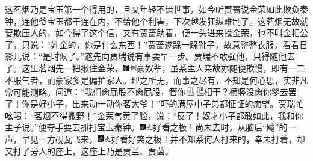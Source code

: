 这茗烟乃是宝玉第一个得用的，且又年轻不谙世事，如今听贾蔷说金荣如此欺负秦钟，连他爷宝玉都干连在内，不给他个利害，下次越发狂纵难制了。这茗烟无故就要欺压人的，如今得了这个信，又有贾蔷助着，便一头进来找金荣，也不叫金相公了，只说：``姓金的，你是什么东西！''贾蔷遂跺一跺靴子，故意整整衣服，看看日影儿说：``是时候了。''遂先向贾瑞说有事要早一步。贾瑞不敢强他，只得随他去了。这里茗烟先一把揪住金荣，{\includegraphics[width=3mm]{../Images/00006}\includegraphics[width=3mm]{../Images/00011}\footnotesize \kaishu 豪奴辈，虽系主人亲故亦随便欺慢，即有一二不服气者，而豪家多是偏护家人。理之所无，而事之尽有，不知是何心思，实非凡常可能测略。}问道：``我们肏屁股不肏屁股，管你\includegraphics[width=8mm]{../images/00022}相干？横竖没肏你爹去罢了！你是好小子，出来动一动你茗大爷！''吓的满屋中子弟都怔怔的痴望。贾瑞忙吆喝：``茗烟不得撒野！''金荣气黄了脸，说：``反了！奴才小子都敢如此，我和你主子说。''便夺手要去抓打宝玉秦钟。{\includegraphics[width=3mm]{../Images/00005}\includegraphics[width=3mm]{../Images/00012}\footnotesize \kaishu 好看之极！}尚未去时，从脑后``飕''的一声，早见一方砚瓦飞来，{\includegraphics[width=3mm]{../Images/00005}\includegraphics[width=3mm]{../Images/00012}\footnotesize \kaishu 好看好笑之极！}并不知系何人打来的，幸未打着，却又打了旁人的座上，这座上乃是贾兰、贾菌。

